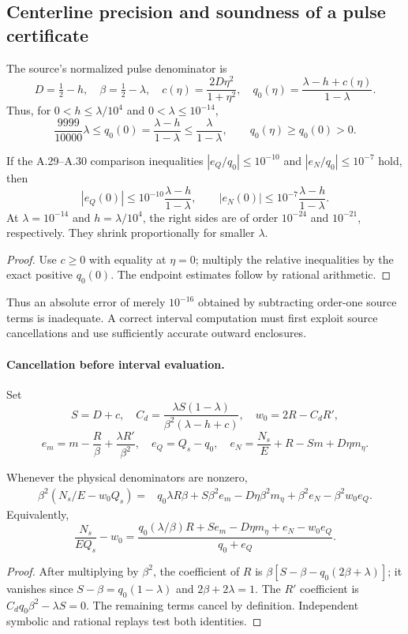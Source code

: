 \subsection*{Centerline precision and soundness of a pulse certificate}
\label{subsec:centerline-proof-gate}
The source's normalized pulse denominator is
\[
D=\tfrac12-h,\quad\beta=\tfrac12-\lambda,\quad
c(\eta)=\frac{2D\eta^2}{1+\eta^2},\quad
q_0(\eta)=\frac{\lambda-h+c(\eta)}{1-\lambda}.
\]
Thus, for $0<h\le\lambda/10^4$ and $0<\lambda\le10^{-14}$,
\[
\frac{9999}{10000}\lambda\le q_0(0)
=\frac{\lambda-h}{1-\lambda}
\le\frac{\lambda}{1-\lambda},\qquad q_0(\eta)\ge q_0(0)>0.
\]
\begin{proposition}
\label{prop:source-pulse-precision}
If the A.29--A.30 comparison inequalities
$|e_Q/q_0|\le10^{-10}$ and $|e_N/q_0|\le10^{-7}$
hold, then
\[
|e_Q(0)|\le 10^{-10}\frac{\lambda-h}{1-\lambda},
\qquad |e_N(0)|\le10^{-7}\frac{\lambda-h}{1-\lambda}.
\]
At $\lambda=10^{-14}$ and $h=\lambda/10^4$, the
right sides are of order $10^{-24}$ and $10^{-21}$,
respectively. They shrink proportionally for smaller $\lambda$.
\end{proposition}
\begin{proof}
Use $c\ge0$ with equality at $\eta=0$; multiply the
relative inequalities by the exact positive $q_0(0)$.
The endpoint estimates follow by rational arithmetic.
\end{proof}
Thus an absolute error of merely $10^{-16}$ obtained by
subtracting order-one source terms is inadequate. A correct
interval computation must first exploit source cancellations
and use sufficiently accurate outward enclosures.

\paragraph{Cancellation before interval evaluation.}
Set
\[
S=D+c,\quad
C_d=\frac{\lambda S(1-\lambda)}
{\beta^2(\lambda-h+c)},\quad w_0=2R-C_dR',
\]
\[
e_m=m-\frac R\beta+\frac{\lambda R'}{\beta^2},
\quad e_Q=Q_s-q_0,\quad
e_N=\frac{N_s}{E}+R-Sm+D\eta m_\eta.
\]
\begin{lemma}
\label{lem:pulse-source-cleared}
Whenever the physical denominators are nonzero,
\begin{align}
\beta^2(N_s/E-w_0Q_s)={}&
q_0\lambda R\beta+S\beta^2 e_m
-D\eta\beta^2m_\eta+\beta^2e_N-\beta^2w_0e_Q.
\label{eq:source-cleared-pulse}
\end{align}
Equivalently,
\[
\frac{N_s}{EQ_s}-w_0=
\frac{q_0(\lambda/\beta)R+Se_m-D\eta m_\eta+
e_N-w_0e_Q}{q_0+e_Q}.
\]
\end{lemma}
\begin{proof}
After multiplying by $\beta^2$, the coefficient of $R$
is $\beta[S-\beta-q_0(2\beta+\lambda)]$; it vanishes since
$S-\beta=q_0(1-\lambda)$ and $2\beta+2\lambda=1$.
The $R'$ coefficient is
$C_dq_0\beta^2-\lambda S=0$. The remaining
terms cancel by definition. Independent symbolic and
rational replays test both identities.
\end{proof}

